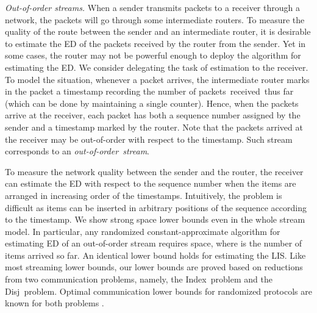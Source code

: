 \documentclass{llncs}
\newcommand{\ind}{{\sc Index}}
\newcommand{\disj}{{\sc Disj}}
\begin{document}
{\it  Out-of-order streams.}
When a sender transmits packets to a receiver through
a network, the packets will go through some intermediate routers.
To measure the quality of the route between
the sender and an intermediate router,
it is desirable to estimate the ED of the packets received
by the router from the sender.
Yet in some cases, the router may not be powerful enough to deploy
the algorithm for estimating the ED.
We consider delegating the task of estimation
to the receiver.
To model the situation, whenever a packet arrives,
the intermediate router marks in the packet a timestamp recording
the number of packets~received~thus far
(which can be done by maintaining a single counter).
Hence, when the packets
arrive at the receiver, each packet has both a sequence number
assigned by the sender and a timestamp marked by the router.
Note that the packets arrived at the receiver may be out-of-order
with respect to the timestamp.
Such stream corresponds to an \emph{out-of-order~stream}.

To measure the
network quality between the sender and the router,
the receiver can estimate the ED with respect to the sequence number
when the items are arranged in increasing order of the timestamps.
Intuitively, the problem is difficult as items can
be inserted in arbitrary positions of the sequence according
to the timestamp.
We show strong space lower bounds even in the whole stream model.
In particular, any randomized constant-approximate
algorithm for estimating ED of an out-of-order stream requires  space,
where  is the number of items arrived so far.
An identical lower bound holds for estimating the LIS.
Like most streaming lower bounds, our lower bounds are proved based on
reductions from two communication problems, namely, the \ind~problem and the
\disj~problem.  Optimal communication lower bounds for randomized protocols are
known for both problems \cite{Abl96,Jay09}.
\end{document}
